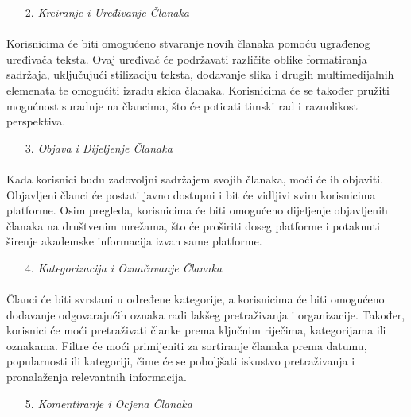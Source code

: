 \begin{enumerate}
	\item[2.] \textit{Kreiranje i Uređivanje Članaka}
\end{enumerate}

\paragraph{}
Korisnicima će biti omogućeno stvaranje novih članaka pomoću ugrađenog uređivača teksta. Ovaj uređivač će podržavati različite oblike formatiranja sadržaja, uključujući stilizaciju teksta, dodavanje slika i drugih multimedijalnih elemenata te omogućiti izradu skica članaka. Korisnicima će se također pružiti mogućnost suradnje na člancima, što će poticati timski rad i raznolikost perspektiva.

\begin{enumerate}
	\item[3.] \textit{Objava i Dijeljenje Članaka}
\end{enumerate}

\paragraph{}
Kada korisnici budu zadovoljni sadržajem svojih članaka, moći će ih objaviti. Objavljeni članci će postati javno dostupni i bit će vidljivi svim korisnicima platforme. Osim pregleda, korisnicima će biti omogućeno dijeljenje objavljenih članaka na društvenim mrežama, što će proširiti doseg platforme i potaknuti širenje akademske informacija izvan same platforme.

\begin{enumerate}
	\item[4.] \textit{Kategorizacija i Označavanje Članaka}
\end{enumerate}

\paragraph{}
Članci će biti svrstani u određene kategorije, a korisnicima će biti omogućeno dodavanje odgovarajućih oznaka radi lakšeg pretraživanja i organizacije. Također, korisnici će moći pretraživati članke prema ključnim riječima, kategorijama ili oznakama. Filtre će moći primijeniti za sortiranje članaka prema datumu, popularnosti ili kategoriji, čime će se poboljšati iskustvo pretraživanja i pronalaženja relevantnih informacija.

\begin{enumerate}
	\item[5.] \textit{Komentiranje i Ocjena Članaka}
\end{enumerate}


